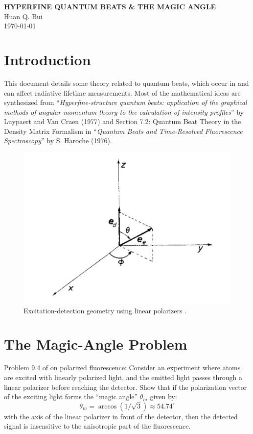 \documentclass[11pt]{article}
\begin{document}
\begin{center}
\textbf{HYPERFINE QUANTUM BEATS \& THE MAGIC ANGLE}\\

Huan Q. Bui\\
\today
\end{center}



\tableofcontents


\newpage


\section{Introduction}
This document details some theory related to quantum beats, which occur in and can affect radiative lifetime measurements. Most of the mathematical ideas are synthesized from ``\textit{Hyperfine-structure quantum beats: application of the graphical methods of angular-momentum theory to the calculation of intensity profiles}'' by Luypaert and Van Craen (1977) and Section 7.2: Quantum Beat Theory in the Density Matrix Formalism in ``\textit{Quantum Beats and Time-Resolved Fluorescence Spectroscopy}'' by S. Haroche (1976).


\begin{figure}[!htb]
	\centering
	\includegraphics[scale=0.7]{beats_1}
	\caption{ Excitation-detection geometry using linear polarizers \cite{Luypaert_1977}.}
	\label{fig:scheme}
\end{figure}




\section{The Magic-Angle Problem}
Problem 9.4 of \cite{demille_atoms} on polarized fluorescence: Consider an experiment where atoms are excited with linearly polarized light, and the emitted light passes through a linear polarizer before reaching the detector. Show that if the polarization vector of the exciting light forms the ``magic angle'' $\theta_m$ given by:
\begin{equation*}
\theta_m = \arccos(1/\sqrt{3}) \approx 54.74^\circ
\end{equation*}
with the axis of the linear polarizer in front of the detector, then the detected signal is insensitive to the anisotropic part of the fluorescence. 
\end{document}
